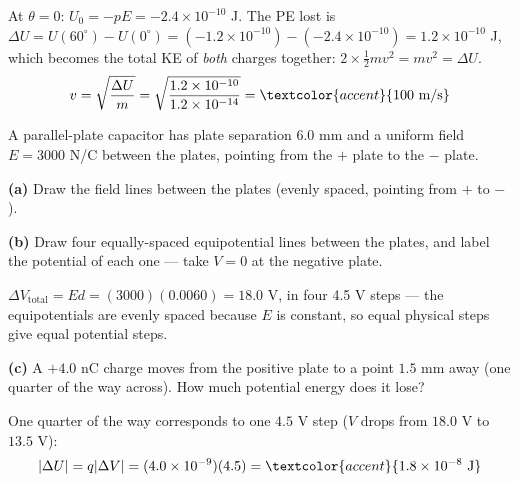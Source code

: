 \documentclass[12pt]{article}
\newcommand{\ANS}[1]{\textcolor{accent}{#1}}
\begin{document}
At $\theta=0$: $U_0=-pE=-2.4\times10^{-10}$ J. The PE lost is
$\Delta U = U(60^\circ)-U(0^\circ) = (-1.2\times10^{-10})-(-2.4\times10^{-10}) =
1.2\times10^{-10}$ J, which becomes the total KE of \emph{both} charges together:
$2\times\tfrac12mv^2 = mv^2 = \Delta U$.
\[
v=\sqrt{\frac{\Delta U}{m}}=\sqrt{\frac{1.2\times10^{-10}}{1.2\times10^{-14}}} =
\ANS{100\text{ m/s}}
\]

\clearpage

\prob A parallel-plate capacitor has plate separation $6.0$ mm and a uniform field
$E=3000$ N/C between the plates, pointing from the $+$ plate to the $-$ plate.

\textbf{(a)} Draw the field lines between the plates (evenly spaced, pointing from
$+$ to $-$).

\textbf{(b)} Draw four equally-spaced equipotential lines between the plates, and
label the potential of each one --- take $V=0$ at the negative plate.

\begin{center}
\end{center}
$\Delta V_{\text{total}}=Ed=(3000)(0.0060)=18.0$ V, in four \ANS{4.5 V} steps ---
the equipotentials are evenly spaced because $E$ is constant, so equal physical
steps give equal potential steps.

\textbf{(c)} A $+4.0$ nC charge moves from the positive plate to a point $1.5$ mm
away (one quarter of the way across). How much potential energy does it lose?

One quarter of the way corresponds to one $4.5$ V step ($V$ drops from $18.0$ V to
$13.5$ V):
\[
|\Delta U| = q|\Delta V| = (4.0\times10^{-9})(4.5) = \ANS{1.8\times10^{-8}\text{ J}}
\]
\end{document}
